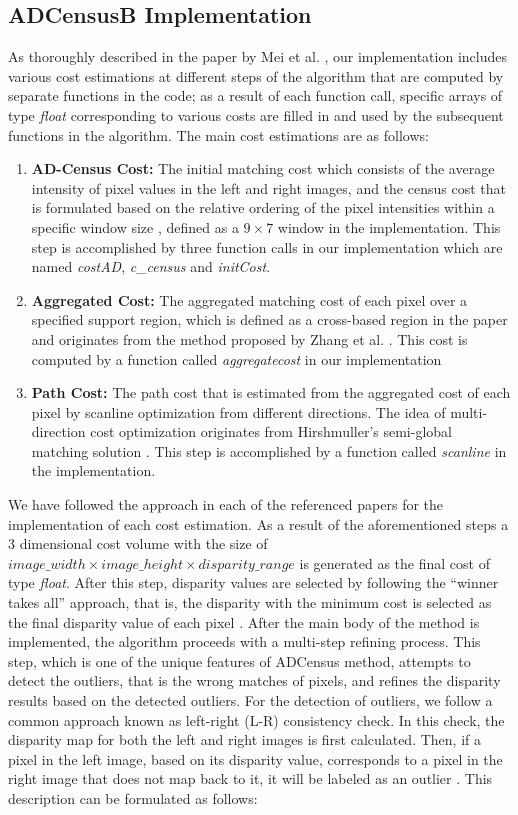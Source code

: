 \subsection{ADCensusB Implementation} \label{subsec:adcB}
As thoroughly described in the paper by Mei et al. \cite{mei11}, our implementation includes various cost estimations
at different steps of the algorithm that are computed by separate functions in the code; as a result of each function call, 
specific arrays of type \textit{float} corresponding to various costs are filled in and used by the subsequent functions in the algorithm.
The main cost estimations are as follows:
\begin{enumerate}
\item \textbf{AD-Census Cost:} The initial matching cost which consists of the average intensity of pixel values in the left and right images, 
and the census cost that is formulated
based on the relative ordering of the pixel intensities within a specific window size \cite{hirseval09}, defined as a $9\times7$ window in the implementation. This 
step is accomplished by three function calls in our implementation which are named \textit{costAD}, \textit{c\_census} and \textit{initCost}.
\item \textbf{Aggregated Cost:} The aggregated matching cost of each pixel over a specified support region, which is defined as a cross-based 
region in the paper and originates from the method proposed by Zhang et al. \cite{zha09}. This cost is computed by a function called \textit{aggregatecost}
in our implementation
\item \textbf{Path Cost:} The path cost that is estimated from the aggregated cost of each pixel by scanline optimization from different directions. The idea of
multi-direction cost optimization originates from Hirshmuller's semi-global matching solution \cite{hir08}. This step is accomplished by a function called 
\textit{scanline} in the implementation.
\end{enumerate}

We have followed the approach in each of the referenced papers for the implementation of each cost estimation. As a result of the aforementioned steps
a 3 dimensional cost volume with the size of $image\_width\times image\_height\times disparity\_range $ is generated as the final cost of type \textit{float}.
After this step, disparity values are selected by following the ``winner takes all'' approach, that is, the disparity with the minimum cost is
selected as the final disparity value of each pixel \cite{sch02}.
After the main body of the method is implemented, the algorithm proceeds with a multi-step refining process. This step, which is one of the unique features
of ADCensus method, attempts to detect the outliers, that is the wrong matches of pixels, and refines the disparity results based on the detected outliers.
For the detection of outliers, we follow a common approach  
known as left-right (L-R) consistency check. In this check, the disparity map for both
the left and right images is first calculated. Then, if a pixel in the left image, based on its disparity value, corresponds to a pixel in the right image
that does not map back to it, it will be labeled as an outlier \cite{mei11}. This description can be formulated as follows:

